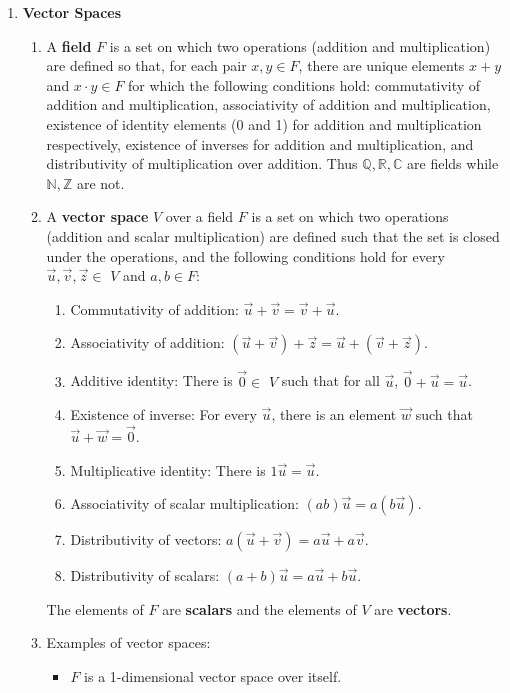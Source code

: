 \documentclass[10pt]{article}
\begin{document}
\date{}
\title{\vspace{-5ex}  \vspace{-5ex}}
\maketitle
\begin{multicols*}{2}
\begin{enumerate}
    \item \textbf{Vector Spaces} 
    \begin{enumerate}
        \item A \textbf{field} $F$ is a set on which two operations (addition and multiplication) are defined so that, for each pair $x,y \in F$, there are unique elements $x+y$ and $x \cdot y \in F$ for which the following conditions hold: commutativity of addition and multiplication, associativity of addition and multiplication, existence of identity elements (0 and 1) for addition and multiplication respectively, existence of inverses for addition and multiplication, and distributivity of multiplication over addition. Thus $\mathbb{Q}, \mathbb{R}, \mathbb{C}$ are fields while $\mathbb{N}, \mathbb{Z}$ are not.
        
         \item A \textbf{vector space} $V$ over a field $F$ is a set on which two operations (addition and scalar multiplication) are defined such that the set is closed under the operations, and the following conditions hold for every $\vec{u},\vec{v},\vec{z} \in$ $V$ and $a,b \in F$:
         \begin{enumerate}
            \item Commutativity of addition: $\vec{u}+\vec{v}=\vec{v}+\vec{u}$.
            \item Associativity of addition: $(\vec{u}+\vec{v})+\vec{z} =\vec{u}+(\vec{v}+\vec{z})$.
            \item Additive identity: There is $\vec{0} \in$ $V$ such that for all $\vec{u}$, $\vec{0}+\vec{u}=\vec{u}$.
            \item Existence of inverse: For every $\vec{u}$, there is an element $\vec{w}$ such that $\vec{u}+\vec{w} = \vec{0}$.
            \item Multiplicative identity: There is $1\vec{u} =\vec{u}$.
            \item Associativity of scalar multiplication: $(ab)\vec{u} = a(b\vec{u})$.
            \item Distributivity of vectors: $a(\vec{u}+\vec{v}) = a\vec{u}+a\vec{v}$.
            \item Distributivity of scalars: $(a+b)\vec{u} = a\vec{u}+b\vec{u}$.
         \end{enumerate}
         The elements of $F$ are \textbf{scalars} and the elements of $V$ are \textbf{vectors}.
         \item Examples of vector spaces:
         \begin{itemize}
             \item $F$ is a 1-dimensional vector space over itself.
             

\end{itemize}
\end{enumerate}
\end{enumerate}
\end{multicols*}
\end{document}
